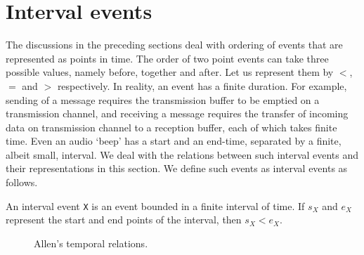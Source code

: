 \section{Interval events}

The discussions in the preceding sections deal with ordering of events that are represented as points in time. 
The order of two point events can take three possible values, namely before, together and after. Let us represent them by 
$<$, $=$ and $>$ respectively.
%
In reality, an event has a finite duration. For example, sending of a message requires the transmission buffer to be emptied 
on a transmission channel, and receiving a message requires the transfer of incoming data on transmission channel to a 
reception buffer, each of which takes finite time. Even an audio `beep' has a start and an end-time, 
separated by a finite, albeit small, interval. We deal with the relations between such interval events and their representations 
in this section.  We define such events as interval events as follows.

\begin{definition}
	An interval event \texttt{X} is an event bounded in a finite interval of time. If $s_X$ and $e_X$ represent
	the start and end points of the interval, then $s_X < e_X$.
\end{definition}


\begin{figure}[htbp!]
\centerline{
}
\caption{Allen's temporal relations.}
\label{fig:clock:Allen}
\end{figure}

